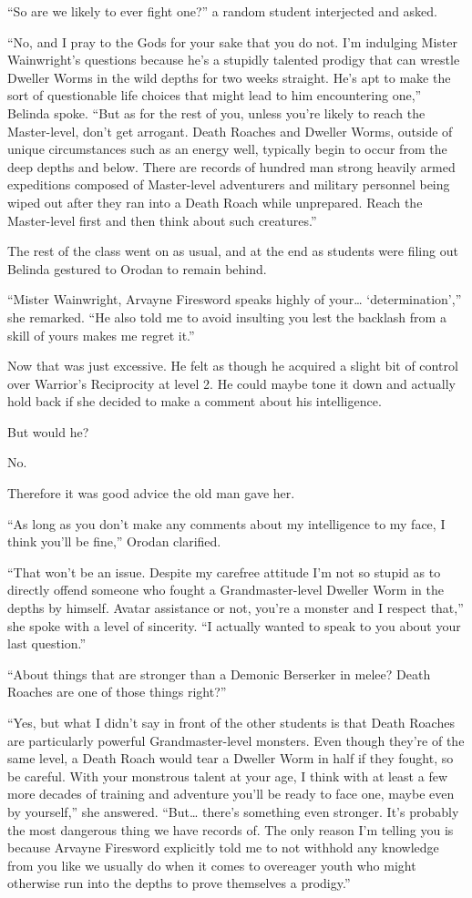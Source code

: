 \documentclass[a4paper,10pt]{book}
\begin{document}
“So are we likely to ever fight one?” a random student interjected and asked.\par
“No, and I pray to the Gods for your sake that you do not. I’m indulging Mister Wainwright’s questions because he’s a stupidly talented prodigy that can wrestle Dweller Worms in the wild depths for two weeks straight. He’s apt to make the sort of questionable life choices that might lead to him encountering one,” Belinda spoke. “But as for the rest of you, unless you’re likely to reach the Master-level, don’t get arrogant. Death Roaches and Dweller Worms, outside of unique circumstances such as an energy well, typically begin to occur from the deep depths and below. There are records of hundred man strong heavily armed expeditions composed of Master-level adventurers and military personnel being wiped out after they ran into a Death Roach while unprepared. Reach the Master-level first and then think about such creatures.”\par
The rest of the class went on as usual, and at the end as students were filing out Belinda gestured to Orodan to remain behind.\par
“Mister Wainwright, Arvayne Firesword speaks highly of your… ‘determination’,” she remarked. “He also told me to avoid insulting you lest the backlash from a skill of yours makes me regret it.”\par
Now that was just excessive. He felt as though he acquired a slight bit of control over Warrior’s Reciprocity at level 2. He could maybe tone it down and actually hold back if she decided to make a comment about his intelligence.\par
But would he?\par
No.\par
Therefore it was good advice the old man gave her.\par
“As long as you don’t make any comments about my intelligence to my face, I think you’ll be fine,” Orodan clarified.\par
“That won’t be an issue. Despite my carefree attitude I’m not so stupid as to directly offend someone who fought a Grandmaster-level Dweller Worm in the depths by himself. Avatar assistance or not, you’re a monster and I respect that,” she spoke with a level of sincerity. “I actually wanted to speak to you about your last question.”\par
“About things that are stronger than a Demonic Berserker in melee? Death Roaches are one of those things right?”\par
“Yes, but what I didn’t say in front of the other students is that Death Roaches are particularly powerful Grandmaster-level monsters. Even though they're of the same level, a Death Roach would tear a Dweller Worm in half if they fought, so be careful. With your monstrous talent at your age, I think with at least a few more decades of training and adventure you’ll be ready to face one, maybe even by yourself,” she answered. “But… there’s something even stronger. It’s probably the most dangerous thing we have records of. The only reason I’m telling you is because Arvayne Firesword explicitly told me to not withhold any knowledge from you like we usually do when it comes to overeager youth who might otherwise run into the depths to prove themselves a prodigy.”\par
\end{document}
